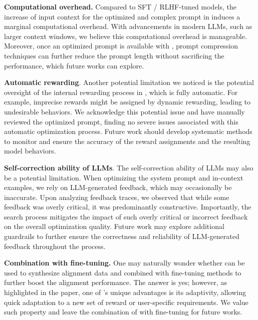 \noindent \textbf{Computational overhead.}
Compared to SFT / RLHF-tuned models, the increase of input context for the optimized and complex prompt in \ours induces a marginal computational overhead. With advancements in modern LLMs, such as larger context windows, we believe this computational overhead is manageable. Moreover, once an optimized prompt is available with \ours, prompt compression techniques can further reduce the prompt length without sacrificing the performance, which future works can explore. 


\noindent \textbf{Automatic rewarding}.
Another potential limitation we noticed is the potential oversight of the internal rewarding process in \ours, which is fully automatic. For example, imprecise rewards might be assigned by dynamic rewarding, leading to undesirable behaviors. We acknowledge this potential issue and have manually reviewed the optimized prompt, finding no severe issues associated with this automatic optimization process. Future work should develop systematic methods to monitor and ensure the accuracy of the reward assignments and the resulting model behaviors. 

\noindent \textbf{Self-correction ability of LLMs}. 
The self-correction ability of LLMs may also be a potential limitation.
When optimizing the system prompt and in-context examples, we rely on LLM-generated feedback, which may occasionally be inaccurate. Upon analyzing feedback traces, we observed that while some feedback was overly critical, it was predominantly constructive. Importantly, the search process mitigates the impact of such overly critical or incorrect feedback on the overall optimization quality. Future work may explore additional guardrails to further ensure the correctness and reliability of LLM-generated feedback throughout the process.


\noindent \textbf{Combination with fine-tuning.}
One may naturally wonder whether \ours can be used to synthesize alignment data and combined with fine-tuning methods to further boost the alignment performance. The answer is yes; however, as highlighted in the paper, one of \ours's unique advantages is its adaptivity, allowing quick adaptation to a new set of reward or user-specific requirements. We value such property and leave the combination of \ours with fine-tuning for future works. 

